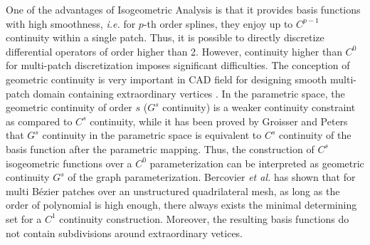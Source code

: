 \documentclass[preprint,12pt]{elsarticle}
\begin{document}
One of the advantages of Isogeometric Analysis is that it provides basis functions with high smoothness, \textit{i.e.} for $p$-th order splines, they enjoy up to $C^{p-1}$ continuity within a single patch. Thus, it is possible to directly discretize differential operators of order higher than 2. However, continuity higher than $C^0$ for multi-patch discretization imposes significant difficulties. The conception of geometric continuity is very important in CAD field \cite{peters_chapter_2002} for designing smooth multi-patch domain containing extraordinary vertices \cite{peters_joining_1992}. In the parametric space, the geometric continuity of order $s$ ($G^s$ continuity) is a weaker continuity constraint as compared to $C^s$ continuity, while it has been proved by Groisser and Peters \cite{groisser_matched_2015} that $G^s$ continuity in the parametric space is equivalent to $C^s$ continuity of the basis function after the parametric mapping. Thus, the construction of $C^s$ isogeometric functions over a $C^0$ parameterization can be interpreted as geometric continuity $G^s$ of the graph parameterization. Bercovier \textit{et al.} \cite{bercovier_smooth_2014} has shown that for multi B\'ezier patches over an unstructured quadrilateral mesh, as long as the order of polynomial is high enough, there always exists the minimal determining set for a $C^1$ continuity construction. Moreover, the resulting basis functions do not contain subdivisions around extraordinary vetices.\par
\end{document}
